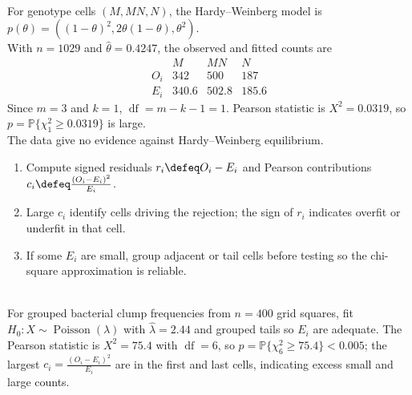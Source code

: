 \begin{example} \label{ex:hardy-weinberg-goodness-of-fit} \\
For genotype cells $(M,MN,N)$, the Hardy--Weinberg model is $p(\theta)=((1-\theta)^2,2\theta(1-\theta),\theta^2)$.\\
With $n=1029$ and $\widehat{\theta}=0.4247$, the observed and fitted counts are
\[
\begin{array}{c|ccc}
&M&MN&N\\ \hline
O_i&342&500&187\\
E_i&340.6&502.8&185.6
\end{array}
\]
Since $m=3$ and $k=1$, $\operatorname{df}=m-k-1=1$. Pearson statistic is $X^2=0.0319$, so $p=\mathbb{P}\{\chi^2_1\geq0.0319\}$ is large.\\
The data give no evidence against Hardy--Weinberg equilibrium.
\end{example}

\begin{method} \label{meth:reading-goodness-of-fit-cells} 
\begin{enumerate}[label=(\roman*)]
\setlength{\itemsep}{0pt}
\item Compute signed residuals $r_i\defeq O_i-E_i$ and Pearson contributions $c_i\defeq\frac{(O_i-E_i)^2}{E_i}$.
\item Large $c_i$ identify cells driving the rejection; the sign of $r_i$ indicates overfit or underfit in that cell.
\item If some $E_i$ are small, group adjacent or tail cells before testing so the chi-square approximation is reliable.
\end{enumerate}
\end{method}

\begin{example} \label{ex:poisson-clumps-goodness-of-fit} \\
For grouped bacterial clump frequencies from $n=400$ grid squares, fit $H_0:X\sim\operatorname{Poisson}(\lambda)$ with $\widehat{\lambda}=2.44$ and grouped tails so $E_i$ are adequate.
The Pearson statistic is $X^2=75.4$ with $\operatorname{df}=6$, so $p=\mathbb{P}\{\chi^2_6\geq75.4\}<0.005$; the largest $c_i=\frac{(O_i-E_i)^2}{E_i}$ are in the first and last cells, indicating excess small and large counts.
\end{example}

